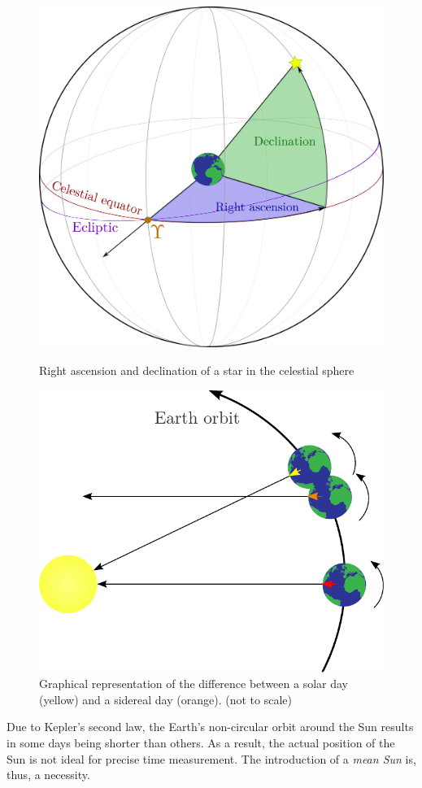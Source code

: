 \documentclass[../main.tex]{subfiles}
\begin{document}
\begin{figure}[htbp]
  \centering
  \begin{minipage}[ht]{0.48\textwidth}
    \centering
    \includegraphics[width=\textwidth]{Images/right_ascension-decli.pdf}
    \caption{Right ascension and declination of a star in the celestial sphere}
    \label{fig:right_ascesion}
  \end{minipage}
  \hfill
  \begin{minipage}[ht]{0.48\textwidth}
    \centering
    \includegraphics[width=\textwidth]{Images/siderial.pdf}
    \caption{Graphical representation of the difference between a solar day (yellow) and a sidereal day (orange). (not to scale)}
    \label{fig:siderial}
  \end{minipage}
\end{figure}
Due to Kepler's second law, the Earth's non-circular orbit around the Sun results in some days being shorter than others. As a result, the actual position of the Sun is not ideal for precise time measurement. The introduction of a \emph{mean Sun} is, thus, a necessity.
\end{document}
